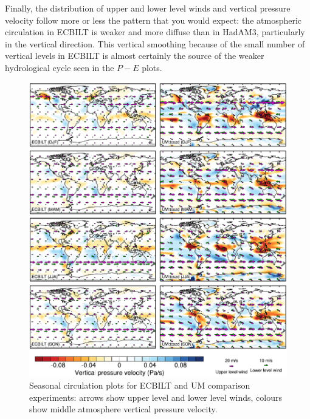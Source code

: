 \documentclass[a4paper,11pt,article]{article}
\begin{document}
Finally, the distribution of upper and lower level winds and vertical
pressure velocity follow more or less the pattern that you would
expect: the atmospheric circulation in ECBILT is weaker and more
diffuse than in HadAM3, particularly in the vertical direction.  This
vertical smoothing because of the small number of vertical levels in
ECBILT is almost certainly the source of the weaker hydrological cycle
seen in the $P-E$ plots.

\begin{figure}
  \begin{center}
    \includegraphics[width=\textwidth]{../expt-1/plots/wind-plots}
  \end{center}
  \caption{Seasonal circulation plots for ECBILT and UM comparison
    experiments: arrows show upper level and lower level winds,
    colours show middle atmosphere vertical pressure velocity.}
  \label{fig:wind}
\end{figure}
\end{document}
